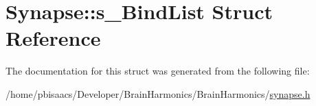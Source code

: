 \hypertarget{structSynapse_1_1s__BindList}{}\section{Synapse\+:\+:s\+\_\+\+Bind\+List Struct Reference}
\label{structSynapse_1_1s__BindList}


The documentation for this struct was generated from the following file\+:\begin{DoxyCompactItemize}
\item 
/home/pbisaacs/\+Developer/\+Brain\+Harmonics/\+Brain\+Harmonics/\mbox{\hyperlink{synapse_8h}{synapse.\+h}}\end{DoxyCompactItemize}
